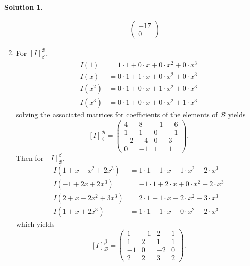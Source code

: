 \documentclass[10pt]{article}
\theoremstyle{definition}
\newtheorem{soln}{Solution}
\begin{document}
\begin{soln}
\begin{enumerate}[label=(\alph*)]
\begin{enumerate}[label=(\roman*)]
\begin{align*}
\begin{pmatrix}
                                                        -17 \\
                                                        0
                                                      \end{pmatrix}
                  \end{align*}
          \end{enumerate}
    \item For $\left[I\right]_\beta^\mathcal{B}$,
          \begin{align*}
            I(1)   & =1\cdot 1 + 0\cdot x + 0\cdot x^2 + 0\cdot x^3 \\
            I(x)   & =0\cdot 1 + 1\cdot x + 0\cdot x^2 + 0\cdot x^3 \\
            I(x^2) & =0\cdot 1 + 0\cdot x + 1\cdot x^2 + 0\cdot x^3 \\
            I(x^3) & =0\cdot 1 + 0\cdot x + 0\cdot x^2 + 1\cdot x^3
          \end{align*}
          solving the associated matrices for coefficients of the elements of $\mathcal{B}$ yields
          $$\left[I\right]_\beta^\mathcal{B}=\begin{pmatrix}
              4  & 8  & -1 & -6 \\
              1  & 1  & 0  & -1 \\
              -2 & -4 & 0  & 3  \\
              0  & -1 & 1  & 1
            \end{pmatrix}.$$
          Then for $\left[I\right]^\beta_\mathcal{B}$,
          \begin{align*}
            I(1 + x - x^2 + 2x^3)  & =1\cdot 1 + 1\cdot x - 1\cdot x^2 + 2\cdot x^3  \\
            I(-1 + 2x + 2x^3)      & =-1\cdot 1 + 2\cdot x + 0\cdot x^2 + 2\cdot x^3 \\
            I(2 + x - 2x^2 + 3x^3) & =2\cdot 1 + 1\cdot x - 2\cdot x^2 + 3\cdot x^3  \\
            I(1 + x + 2x^3)        & =1\cdot 1 + 1\cdot x + 0\cdot x^2 + 2\cdot x^3
          \end{align*}
          which yields
          $$\left[I\right]^\beta_\mathcal{B}=
            \begin{pmatrix}
              1  & -1 & 2  & 1 \\
              1  & 2  & 1  & 1 \\
              -1 & 0  & -2 & 0 \\
              2  & 2  & 3  & 2
            \end{pmatrix}.$$

\end{enumerate}
\end{soln}
\end{document}
